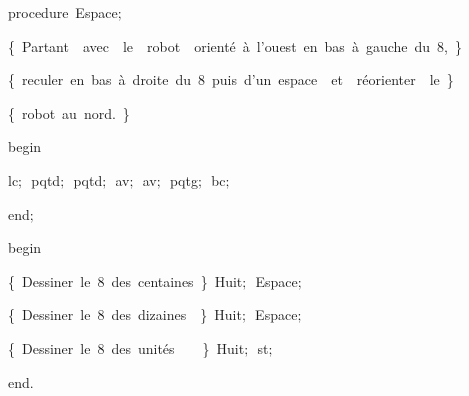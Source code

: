 {\pagebreak[3] 
\vspace{\neglskip}\mbox{\blc  \blk\idt  \mcl procedure\idt \ Espace$;$}\par 
\vspace{\neglskip}\mbox{\blc  \blk\blk\idt  \cmt  \{\ Partant\ \ avec\ \ le\ \ robot\ \ orienté\ à\ l{'}ouest\ en\ bas\ à\ gauche\ du\ 8,\ \}\idt }\par 
\vspace{\neglskip}\mbox{\blc  \blk\blk\idt  \cmt  \{\ reculer\ en\ bas\ à\ droite\ du\ 8\ puis\ d{'}un\ espace\ \ et\ \ réorienter\ \ le\ \}\idt }\par 
\vspace{\neglskip}\mbox{\blc  \blk\blk\idt  \cmt  \{\ robot\ au\ nord.\ \}\idt }\par 
\vspace{\neglskip}\mbox{\blc  \blk\idt  \mcl begin\idt }\par 
\vspace{\neglskip}\mbox{\blc  \blk\blk\idt  lc$;$\ pqtd$;$\ pqtd$;$\ av$;$\ av$;$\ pqtg$;$\ bc$;$\ }\par 
\vspace{\neglskip}\mbox{\blc  \blk\idt  \mcl end\idt $;$}\par 
\medskip

\vspace{\neglskip}\mbox{\blc  \idt  \mcl begin\idt }\par 
\vspace{\neglskip}\mbox{\blc  \blk\idt  \cmt  \{\ Dessiner\ le\ 8\ des\ centaines\ \}\idt \ Huit$;$\ Espace$;$\ }\par 
\vspace{\neglskip}\mbox{\blc  \blk\idt  \cmt  \{\ Dessiner\ le\ 8\ des\ dizaines\ \ \}\idt \ Huit$;$\ Espace$;$\ }\par 
\vspace{\neglskip}\mbox{\blc  \blk\idt  \cmt  \{\ Dessiner\ le\ 8\ des\ unités\ \ \ \ \}\idt \ Huit$;$\ st$;$\ }\par 
\vspace{\neglskip}\mbox{\blc  \idt  \mcl end\idt $.$}\par 

\medskip }

